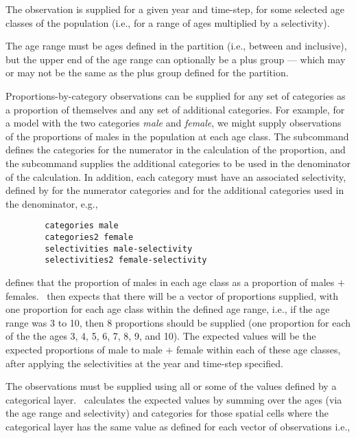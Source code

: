 {{{{The observation is supplied for a given year and time-step, for some selected age classes of the population (i.e., for a range of ages multiplied by a selectivity).

The age range must be ages defined in the partition (i.e., between  and  inclusive), but the upper end of the age range can optionally be a plus group --- which may or may not be the same as the plus group defined for the partition. 

Proportions-by-category observations can be supplied for any set of categories as a proportion of themselves and any set of additional categories. For example, for a model with the two categories \emph{male} and \emph{female}, we might supply observations of the proportions of males in the population at each age class. The subcommand  defines the categories for the numerator in the calculation of the proportion, and the subcommand  supplies the additional categories to be used in the denominator of the calculation. In addition, each category must have an associated selectivity, defined by  for the numerator categories and  for the additional categories used in the denominator, e.g., 

{\small{\begin{verbatim}
		categories male
		categories2 female
		selectivities male-selectivity
		selectivities2 female-selectivity
		\end{verbatim}}}

defines that the proportion of males in each age class as a proportion of males $+$ females. \CNAME\ then expects that there will be a vector of proportions supplied, with one proportion for each age class within the defined age range, i.e., if the age range was 3 to 10, then 8 proportions should be supplied (one proportion for each of the the ages 3, 4, 5, 6, 7, 8, 9, and 10). The expected values will be the expected proportions of male to male $+$ female within each of these age classes, after applying the selectivities at the year and time-step specified. 

The observations must be supplied using all or some of the values defined by a categorical layer. \CNAME\ calculates the expected values by summing over the ages (via the age range and selectivity) and categories for those spatial cells where the categorical layer has the same value as defined for each vector of observations i.e.,

}}}}
